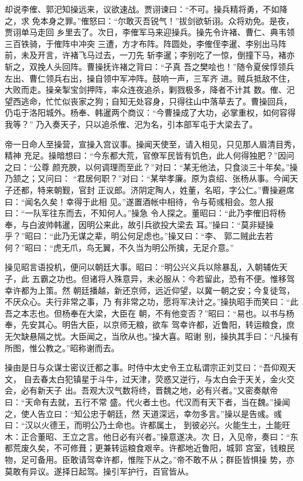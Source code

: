 却说李傕、郭汜知操远来，议欲速战。贾诩谏曰：“不可。操兵精将勇，不如降之，求
免本身之罪。”傕怒曰：“尔敢灭吾锐气！”拔剑欲斩诩。众将劝免。是夜，贾诩单马走回
乡里去了。次日，李傕军马来迎操兵。操先令许褚、曹仁、典韦领三百铁骑，于傕阵中冲突
三遭，方才布阵。阵圆处，李傕侄李暹、李别出马阵前，未及开言，许褚飞马过去，一刀先
斩李暹；李别吃了一惊，倒撞下马，褚亦斩之，双挽人头回阵。曹操抚许褚之背曰：“子真
吾之樊哙也！”随令夏侯惇领兵左出、曹仁领兵右出，操自领中军冲阵。鼓响一声，三军齐
进。贼兵抵敌不住，大败而走。操亲掣宝剑押阵，率众连夜追杀，剿戮极多，降者不计其
数。傕、汜望西逃命，忙忙似丧家之狗；自知无处容身，只得往山中落草去了。曹操回兵，
仍屯于洛阳城外。杨奉、韩暹两个商议：“今曹操成了大功，必掌重权，如何容得我等？”
乃入奏天子，只以追杀傕、汜为名，引本部军屯于大梁去了。

帝一日命人至操营，宣操入宫议事。操闻天使至，请入相见，只见那人眉清目秀，精神
充足。操暗想曰：“今东都大荒，官僚军民皆有饥色，此人何得独肥？”因问之曰：“公尊
颜充腴，以何调理而至此？”对曰：“某无他法，只食淡三十年矣。”操乃颔之；又问曰：
“君居何职？”对曰：“某举孝廉。原为袁绍、张杨从事。今闻天子还都，特来朝觐，官封
正议郎。济阴定陶人，姓董，名昭，字公仁。”曹操避席曰：“闻名久矣！幸得于此相
见。”遂置酒帐中相待，令与荀彧相会。忽人报曰：“一队军往东而去，不知何人。”操急
令人探之。董昭曰：“此乃李傕旧将杨奉，与白波帅韩暹，因明公来此，故引兵欲投大梁去
耳。”操曰：“莫非疑操乎？”昭曰：“此乃无谋之辈，明公何足虑也。”操又曰：“李、
郭二贼此去若何？”昭曰：“虎无爪，鸟无翼，不久当为明公所擒，无足介意。”

操见昭言语投机，便问以朝廷大事。昭曰：“明公兴义兵以除暴乱，入朝辅佐天子，此
五霸之功也。但诸将人殊意异，未必服从：今若留此，恐有不便。惟移驾幸许都为上策。然
朝廷播越，新还京师，远近仰望，以冀一朝之安；今复徒驾，不厌众心。夫行非常之事，乃
有非常之功，愿将军决计之。”操执昭手而笑曰：“此吾之本志也。但杨奉在大梁，大臣在
朝，不有他变否？”昭曰：“易也。以书与杨奉，先安其心。明告大臣，以京师无粮，欲车
驾幸许都，近鲁阳，转运粮食，庶无欠缺悬隔之忧。大臣闻之，当欣从也。”操大喜。昭谢
别，操执其手曰：“凡操有所图，惟公教之。”昭称谢而去。

操由是日与众谋士密议迁都之事。时侍中太史令王立私谓宗正刘艾曰：“吾仰观天文，
自去春太白犯镇星于斗牛，过天津，荧惑又逆行，与太白会于天关，金火交会，必有新天子
出。吾观大汉气数将终，晋魏之地，必有兴者。”又密奏献帝曰：“天命有去就，五行不常
盛。代火者土也。代汉而有天下者，当在魏。”操闻之，使人告立曰：“知公忠于朝廷，然
天道深远，幸勿多言。”操以是告彧。彧曰：“汉以火德王，而明公乃土命也。许都属土，
到彼必兴。火能生土，土能旺木：正合董昭、王立之言。他日必有兴者。”操意遂决。次
日，入见帝，奏曰：“东都荒废久矣，不可修葺；更兼转运粮食艰辛。许都地近鲁阳，城郭
宫室，钱粮民物，足可备用。臣敢请驾幸许都，惟陛下从之。”帝不敢不从；群臣皆惧操
势，亦莫敢有异议。遂择日起驾。操引军护行，百官皆从。

